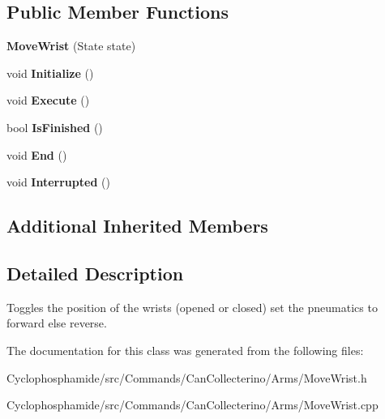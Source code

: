 \subsection*{Public Member Functions}
\begin{DoxyCompactItemize}
\item 
\hypertarget{class_move_wrist_a520569159ba16c6b773306b8d06c6dc2}{}{\bfseries Move\+Wrist} (State state)\label{class_move_wrist_a520569159ba16c6b773306b8d06c6dc2}

\item 
\hypertarget{class_move_wrist_a7b053ffafaef440ebec6b1719474353b}{}void {\bfseries Initialize} ()\label{class_move_wrist_a7b053ffafaef440ebec6b1719474353b}

\item 
\hypertarget{class_move_wrist_a1f38db78ec0dafaa9cfe83cdb5bc133e}{}void {\bfseries Execute} ()\label{class_move_wrist_a1f38db78ec0dafaa9cfe83cdb5bc133e}

\item 
\hypertarget{class_move_wrist_aea1c4b4c5984725cb4302a38850529e8}{}bool {\bfseries Is\+Finished} ()\label{class_move_wrist_aea1c4b4c5984725cb4302a38850529e8}

\item 
\hypertarget{class_move_wrist_a98b40a9310e27fbbead96c0208af0931}{}void {\bfseries End} ()\label{class_move_wrist_a98b40a9310e27fbbead96c0208af0931}

\item 
\hypertarget{class_move_wrist_ad44c5f341795ac74c24b4fc3fcf1db1c}{}void {\bfseries Interrupted} ()\label{class_move_wrist_ad44c5f341795ac74c24b4fc3fcf1db1c}

\end{DoxyCompactItemize}
\subsection*{Additional Inherited Members}


\subsection{Detailed Description}
Toggles the position of the wrists (opened or closed) set the pneumatics to forward else reverse. 

The documentation for this class was generated from the following files\+:\begin{DoxyCompactItemize}
\item 
Cyclophosphamide/src/\+Commands/\+Can\+Collecterino/\+Arms/Move\+Wrist.\+h\item 
Cyclophosphamide/src/\+Commands/\+Can\+Collecterino/\+Arms/Move\+Wrist.\+cpp\end{DoxyCompactItemize}
